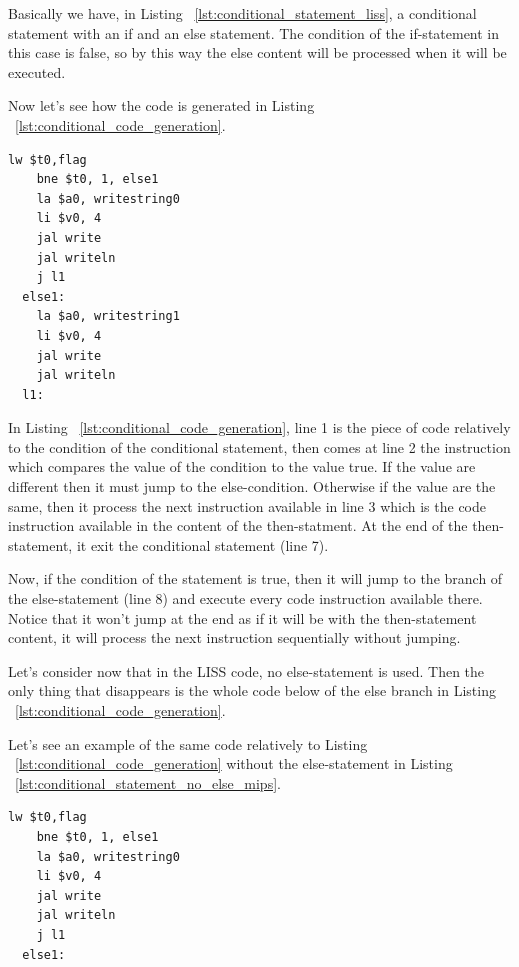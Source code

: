 \documentclass[
  oneside,
  11pt, a4paper,
  footinclude=true,
  headinclude=true,
  cleardoublepage=empty
]{scrbook}
\begin{document}
Basically we have, in Listing ~\ref{lst:conditional_statement_liss}, a conditional statement with an if and an else statement. The condition of the if-statement  in this case is false, so by this way the else content will be processed when it will be executed.

Now let's see how the code is generated in Listing ~\ref{lst:conditional_code_generation}.

\begin{lstlisting}[caption={Code generated for conditional statement in MIPS},label={lst:conditional_code_generation}]
    lw $t0,flag		
    bne $t0, 1, else1		
    la $a0, writestring0
    li $v0, 4
    jal write		
    jal writeln		
    j l1		
  else1:		
    la $a0, writestring1
    li $v0, 4
    jal write		
    jal writeln		
  l1:		
\end{lstlisting}

In Listing ~\ref{lst:conditional_code_generation}, line 1 is the piece of code relatively to the condition of the conditional statement, then comes at line 2 the instruction which compares the value of the condition to the value true. If the value are different then it must jump to the else-condition. Otherwise if the value are the same, then it process the next instruction available in line 3 which is the code instruction available in the content of the then-statment. At the end of the then-statement, it exit the conditional statement (line 7).

Now, if the condition of the statement is true, then it will jump to the branch of the else-statement (line 8) and execute every code instruction available there. Notice that it won't jump at the end as if it will be with the then-statement content, it will process the next instruction sequentially without jumping.

Let's consider now that in the LISS code, no else-statement is used. Then the only thing that disappears is the whole code below of the else branch in Listing ~\ref{lst:conditional_code_generation}.

Let's see an example of the same code relatively to Listing ~\ref{lst:conditional_code_generation} without the else-statement in Listing ~\ref{lst:conditional_statement_no_else_mips}.

\begin{lstlisting}[caption={Code generated for conditional statements without an else-statement in MIPS},label={lst:conditional_statement_no_else_mips}]
    lw $t0,flag		
    bne $t0, 1, else1		
    la $a0, writestring0
    li $v0, 4
    jal write		
    jal writeln		
    j l1		
  else1:
\end{lstlisting}
\end{document}
